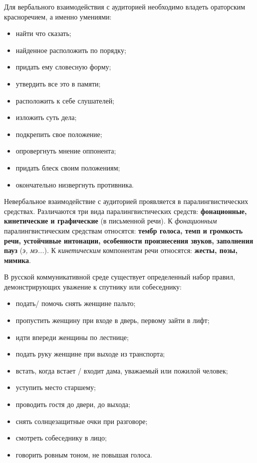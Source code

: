  Для вербального взаимодействия с аудиторией необходимо владеть ораторским красноречием, а именно умениями:
\begin{itemize}
    \item найти что сказать;
    \item найденное расположить по порядку;
    \item придать ему словесную форму;
    \item утвердить все это в памяти;
    \item расположить к себе слушателей;
    \item изложить суть дела;
    \item подкрепить свое положение;
    \item опровергнуть мнение оппонента;
    \item придать блеск своим положениям;
    \item окончательно низвергнуть противника.
\end{itemize}

 Невербальное взаимодействие с аудиторией проявляется в паралингвистических средствах. 
 Различаются три вида паралингвистических средств: \textbf{фонационные, кинетические и графические} (в письменной речи). 
 К \textit{фонационным} паралингвистическим средствам
 относятся: \textbf{тембр голоса, темп и громкость речи, устойчивые интонации, особенности
 произнесения звуков, заполнения пауз} (\textit{э, мэ...}). К \textit{кинетическим} компонентам речи относятся: \textbf{жесты, позы, мимика}.

 В русской коммуникативной среде существует определенный набор правил, демонстрирующих уважение к спутнику или собеседнику:
 \begin{itemize}
    \item подать/ помочь снять женщине пальто;
    \item пропустить женщину при входе в дверь, первому зайти в лифт;
    \item идти впереди женщины по лестнице;
    \item подать руку женщине при выходе из транспорта;
    \item встать, когда встает / входит дама, уважаемый или пожилой человек;
    \item уступить место старшему;
    \item проводить гостя до двери, до выхода;
    \item снять солнцезащитные очки при разговоре;
    \item смотреть собеседнику в лицо;
    \item говорить ровным тоном, не повышая голоса.
\end{itemize}

